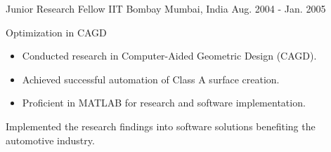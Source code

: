 \begin{cventries}
  \cventry
    {Junior Research Fellow} %
    {IIT Bombay} %
    {Mumbai, India} %
    {Aug. 2004 - Jan. 2005} %
    {
      \begin{cvitems} %
        \item {Optimization in CAGD}
        \begin{itemize}
          \item Conducted research in Computer-Aided Geometric Design (CAGD).
          \item Achieved successful automation of Class A surface creation.
          \item Proficient in MATLAB for research and software implementation.
          \end{itemize}
        Implemented the research findings into software solutions benefiting the automotive industry.
      \end{cvitems}
    }
\end{cventries}
